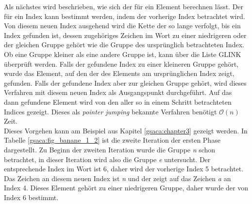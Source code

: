 Als nächstes wird beschrieben, wie sich der \prevpointer für ein Element berechnen lässt. 
Der \prevpointer für ein Index kann bestimmt werden, indem der vorherige Index betrachtet wird. 
Von diesem neuen Index ausgehend wird die Kette der \prevpointer so lange verfolgt, bis ein Index gefunden ist, dessen zugehöriges Zeichen im Wort zu einer niedrigeren oder der gleichen Gruppe gehört wie die Gruppe des ursprünglich betrachteten Index. 
Ob eine Gruppe kleiner als eine andere Gruppe ist, kann über die Liste GLINK überprüft werden. 
Falls der gefundene Index zu einer kleineren Gruppe gehört, wurde das Element, auf den der \prevpointer des Elements am ursprünglichen Index zeigt, gefunden. 
Falls der gefundene Index aber zur gleichen Gruppe gehört, wird dieses Verfahren mit diesem neuen Index als Ausgangspunkt durchgeführt. 
Auf das dann gefundene Element wird von den \prevpointern aller so in einem Schritt betrachteten Indices gezeigt. 
Dieses als \textit{pointer jumping} bekannte Verfahren benötigt $\mathcal O(n)$ Zeit.\\
Dieses Vorgehen kann am Beispiel aus Kapitel \ref{gsaca:chapter3} gezeigt werden. 
In Tabelle \ref{gsaca:fig_banane_1_2} ist die zweite Iteration der ersten Phase dargestellt. 
Zu Beginn der zweiten Iteration wurde die Gruppe \textit{n} schon betrachtet, in dieser Iteration wird also die Gruppe \textit{e} untersucht. 
Der entsprechende Index im Wort ist 6, daher wird der vorherige Index 5 betrachtet. 
Das Zeichen an diesem neuen Index ist \textit{n} und der \prevpointer zeigt auf das Zeichen \textit{a} an Index 4. 
Dieses Element gehört zu einer niedrigeren Gruppe, daher wurde der \prevpointer von Index 6 bestimmt.\\

